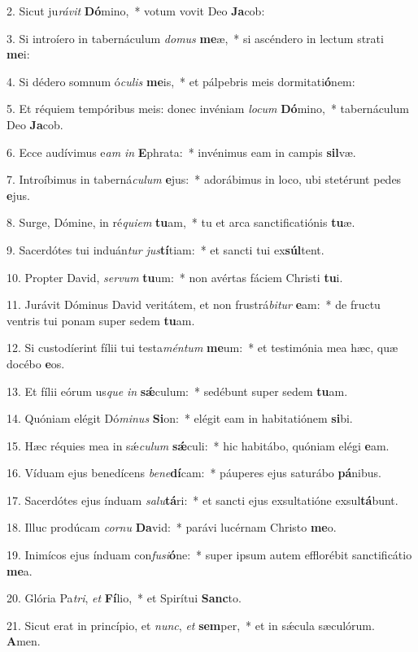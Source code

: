 2. Sicut ju\textit{rá}\textit{vit} \textbf{Dó}mino,~*  votum vovit Deo \textbf{Ja}cob:\

3. Si introíero in tabernáculum \textit{do}\textit{mus} \textbf{me}æ,~*  si ascéndero in lectum strati \textbf{me}i:\

4. Si dédero somnum ó\textit{cu}\textit{lis} \textbf{me}is,~*  et pálpebris meis dormitati\textbf{ó}nem:\

5. Et réquiem tempóribus meis: donec invéniam \textit{lo}\textit{cum} \textbf{Dó}mino,~*  tabernáculum Deo \textbf{Ja}cob.\

6. Ecce audívimus e\textit{am} \textit{in} \textbf{E}phrata:~*  invénimus eam in campis \textbf{sil}væ.\

7. Introíbimus in taberná\textit{cu}\textit{lum} \textbf{e}jus:~*  adorábimus in loco, ubi stetérunt pedes \textbf{e}jus.\

8. Surge, Dómine, in ré\textit{qui}\textit{em} \textbf{tu}am,~*  tu et arca sanctificatiónis \textbf{tu}æ.\

9. Sacerdótes tui induán\textit{tur} \textit{jus}\textbf{tí}tiam:~*  et sancti tui ex\textbf{súl}tent.\

10. Propter David, \textit{ser}\textit{vum} \textbf{tu}um:~*  non avértas fáciem Christi \textbf{tu}i.\

11. Jurávit Dóminus David veritátem, et non frustrá\textit{bi}\textit{tur} \textbf{e}am:~*  de fructu ventris tui ponam super sedem \textbf{tu}am.\

12. Si custodíerint fílii tui testa\textit{mén}\textit{tum} \textbf{me}um:~*  et testimónia mea hæc, quæ docébo \textbf{e}os.\

13. Et fílii eórum us\textit{que} \textit{in} \textbf{sǽ}culum:~*  sedébunt super sedem \textbf{tu}am.\

14. Quóniam elégit Dó\textit{mi}\textit{nus} \textbf{Si}on:~*  elégit eam in habitatiónem \textbf{si}bi.\

15. Hæc réquies mea in sǽ\textit{cu}\textit{lum} \textbf{sǽ}culi:~*  hic habitábo, quóniam elégi \textbf{e}am.\

16. Víduam ejus benedícens \textit{be}\textit{ne}\textbf{dí}cam:~*  páuperes ejus saturábo \textbf{pá}nibus.\

17. Sacerdótes ejus índuam \textit{sa}\textit{lu}\textbf{tá}ri:~*  et sancti ejus exsultatióne exsul\textbf{tá}bunt.\

18. Illuc prodúcam \textit{cor}\textit{nu} \textbf{Da}vid:~*  parávi lucérnam Christo \textbf{me}o.\

19. Inimícos ejus índuam con\textit{fu}\textit{si}\textbf{ó}ne:~*  super ipsum autem efflorébit sanctificátio \textbf{me}a.\

20. Glória Pa\textit{tri}, \textit{et} \textbf{Fí}lio,~*  et Spirítui \textbf{Sanc}to.\

21. Sicut erat in princípio, et \textit{nunc}, \textit{et} \textbf{sem}per,~*  et in sǽcula sæculórum. \textbf{A}men.\

